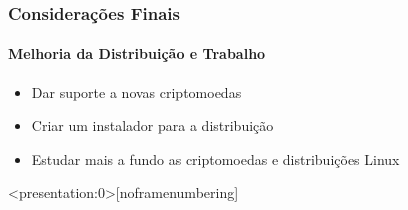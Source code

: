 \documentclass[aspectratio=43]{beamer}
\begin{document}
\begin{frame}
    \frametitle{Considerações Finais}
    \framesubtitle{Melhoria da Distribuição e Trabalho}

    \begin{itemize}
        \item Dar suporte a novas criptomoedas

        \item Criar um instalador para a distribuição

        \item Estudar mais a fundo as criptomoedas e
            distribuições Linux

    \end{itemize}
\end{frame}




\begin{frame}<presentation:0>[noframenumbering]

\end{frame}

\end{document}
